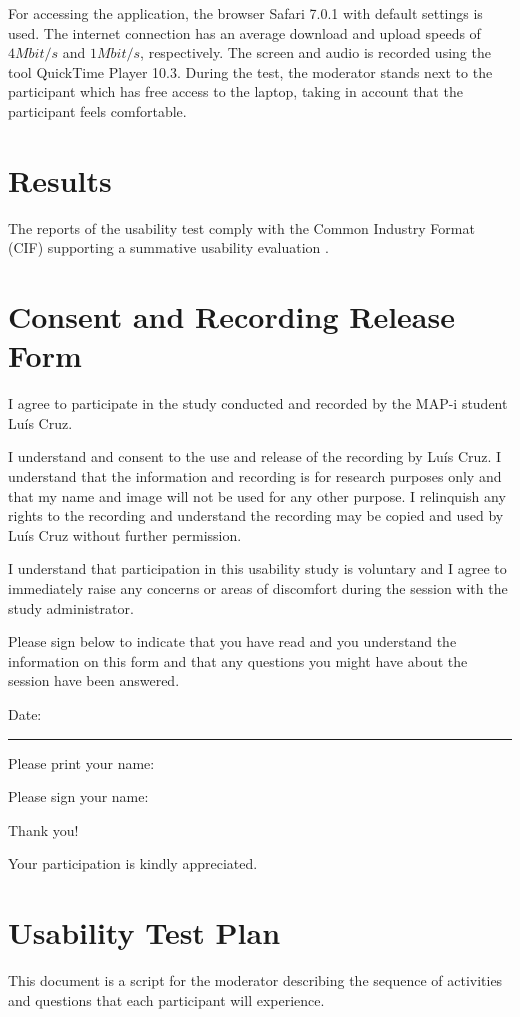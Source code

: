 \documentclass[a4paper]{article}
\begin{document}
For accessing the application, the browser Safari 7.0.1 with default settings is used. The internet connection has an average download and upload speeds of $4 Mbit/s$ and $1Mbit/s$, respectively. The screen and audio is recorded using the tool QuickTime Player 10.3. During the test, the moderator stands next to the participant which has free access to the laptop, taking in account that the participant feels comfortable.



\section{Results}
The reports of the usability test comply with the Common Industry Format (CIF) supporting a summative usability evaluation \citep{iusr2006cif}.

\appendix
\section{Consent and Recording Release Form}

I agree to participate in the study conducted and recorded by the MAP-i student Luís Cruz. 

I understand and consent to the use and release of the recording by Luís Cruz. I understand that the information and recording is for research purposes only and that my name and image will not be used for any other purpose. I relinquish any rights to the recording and understand the recording may be copied and used by Luís Cruz without further permission. 

I understand that participation in this usability study is voluntary and I agree to immediately raise any concerns or areas of discomfort during the session with the study administrator.

Please sign below to indicate that you have read and you understand the information on this form and that any questions you might have about the session have been answered. 

Date: \rule{2cm}{0.4pt} 

Please print your name: \hrulefill

Please sign your name: \hrulefill


Thank you!

Your participation is kindly appreciated.


\section{Usability Test Plan}
\label{sec:usabilityTestPlan}
This document is a script for the moderator describing the sequence of activities and questions that each participant will experience.
\end{document}
